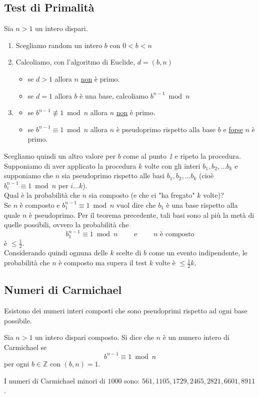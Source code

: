 \documentclass[a4paper,12pt, oneside]{book}
\begin{document}
\subsection{Test di Primalità}
Sia $n>1$ un intero dispari.
\begin{enumerate}
	\item Scegliamo random un intero $b$ con $0 < b < n$
	\item Calcoliamo, con l'algoritmo di Euclide, $d=(b,n)$
	      \begin{itemize}
		      \item se $d>1$ allora $n$ \underline{non} è primo.
		      \item se $d=1$ allora $b$ è una base, calcoliamo $b^{n-1} \bmod n$
	      \end{itemize}
	\item \begin{itemize}
		      \item se $b^{n-1} \not\equiv 1 \bmod n$ allora $n$ \underline{non} è primo.
		      \item se $b^{n-1} \equiv 1 \bmod n$ allora $n$ è pseudoprimo rispetto alla base $b$ e \underline{forse} $n$ è primo.
	      \end{itemize}
\end{enumerate}
Scegliamo quindi un altro valore per $b$ come al punto \textit{1} e ripeto la procedura.\\

Supponiamo di aver applicato la procedura $k$ volte con gli interi $b_1, b_2, \dots b_k$ e supponiamo che $n$ sia pseudoprimo rispetto alle basi $b_1, b_2, \dots b_k$ (cioè $b_i^{n-1} \equiv 1 \bmod n$ per $i \dots k$).\\

Qual è la probabilità che $n$ sia composto (e che ci "ha fregato" $k$ volte)?\\
Se $n$ è composto e $b_1^{n-1} \equiv 1 \bmod n$ vuol dire che $b_1$ è una base rispetto alla quale $n$ è pseudoprimo.
Per il teorema precedente, tali basi sono al più la metà di quelle possibili, ovvero la probabilità che
$$b_1^{n-1} \equiv 1 \bmod n \qquad \mbox{ e } \qquad n \mbox{ è composto}$$ è $\leq \frac{1}{2}$.\\
Considerando quindi ognuna delle $k$ scelte di $b$ come un evento indipendente, le probabilità che $n$ è composto ma supera il test $k$ volte è $\leq \frac{1}{2} k$.

\subsection{Numeri di Carmichael}
Esistono dei numeri interi composti che sono pseudoprimi rispetto ad ogni base possibile.
\begin{definizione}
	Sia $n > 1$ un intero dispari composto.
	Si dice che $n$ è un numero intero di Carmichael se
	$$b^{n-1} \equiv 1 \bmod n$$
	per ogni $b \in \mathbb{Z}$ con $(b,n)=1$.
\end{definizione}
\begin{nota}
	I numeri di Carmichael minori di $1000$ sono: $561, 1105, 1729, 2465, 2821, 6601, 8911$.
\end{nota}
\end{document}

